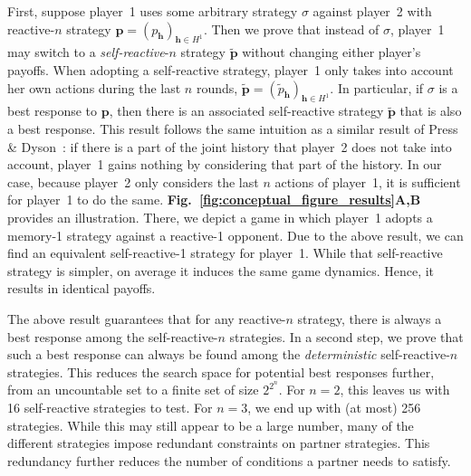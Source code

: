 \documentclass[11pt]{article}
\newcommand{\figref}[1]{{\textbf{Fig.~\ref{#1}}}}
\begin{document}
First, suppose player~1 uses some arbitrary strategy $\sigma$ against player~2 with reactive-$n$ strategy \mbox{$\mathbf{p}\!=\!(p_\mathbf{h})_{\mathbf{h}\in H^1}$}. 
Then we prove that instead of $\sigma$, player~1 may switch to a {\it self-reactive}-$n$ strategy $\mathbf{\tilde{p}}$ without changing either player's payoffs. 
When adopting a self-reactive strategy, player~1 only takes into account her own actions during the last $n$ rounds, 
$\mathbf{\tilde{p}} \!=\! (\tilde{p}_\mathbf{h})_{\mathbf{h} \in H^1}$.
In particular, if $\sigma$ is a best response to $\mathbf{p}$, then there is an associated self-reactive strategy $\mathbf{\tilde p}$ that is also a best response. 
This result follows the same intuition as a similar result of Press \& Dyson~\cite{press:PNAS:2012}: 
if there is a part of the joint history that player~2 does not take into account, player~1 gains nothing by considering that part of the history. 
In our case, because player~2 only considers the last $n$ actions of player~1, it is sufficient for player~1 to do the same.
\figref{fig:conceptual_figure_results}\textbf{A,B} provides an illustration.  
There, we depict a game in which player~1 adopts a memory-1 strategy against a reactive-1 opponent. 
Due to the above result, we can find an equivalent self-reactive-1 strategy for player~1. 
While that self-reactive strategy is simpler, on average it induces the same game dynamics. 
Hence, it results in identical payoffs. 

The above result guarantees that for any reactive-$n$ strategy, there is always a best response among the self-reactive-$n$ strategies. 
In a second step, we prove that such a best response can always be found among the {\it deterministic} self-reactive-$n$ strategies. 
This reduces the search space for potential best responses further, from an uncountable set to a finite set of size $2^{2^n}$. 
For $n\!=\!2$, this leaves us with 16 self-reactive strategies to test. 
For $n\!=\!3$, we end up with (at most) 256 strategies. 
While this may still appear to be a large number, many of the different strategies impose redundant constraints on partner strategies.
This redundancy further reduces the number of conditions a partner needs to satisfy.\\


\end{document}
